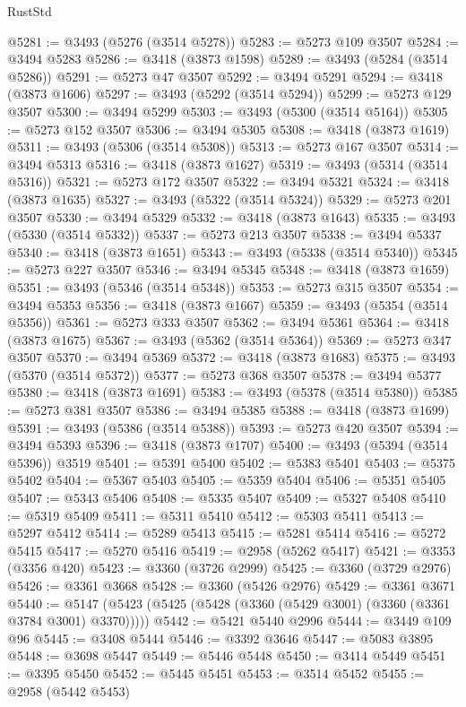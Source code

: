 \begin{lexlean}{RustStd}
\begin{coremodule}
@5281 := @3493 (@5276 (@3514 @5278))
@5283 := @5273 @109 @3507
@5284 := @3494 @5283
@5286 := @3418 (@3873 @1598)
@5289 := @3493 (@5284 (@3514 @5286))
@5291 := @5273 @47 @3507
@5292 := @3494 @5291
@5294 := @3418 (@3873 @1606)
@5297 := @3493 (@5292 (@3514 @5294))
@5299 := @5273 @129 @3507
@5300 := @3494 @5299
@5303 := @3493 (@5300 (@3514 @5164))
@5305 := @5273 @152 @3507
@5306 := @3494 @5305
@5308 := @3418 (@3873 @1619)
@5311 := @3493 (@5306 (@3514 @5308))
@5313 := @5273 @167 @3507
@5314 := @3494 @5313
@5316 := @3418 (@3873 @1627)
@5319 := @3493 (@5314 (@3514 @5316))
@5321 := @5273 @172 @3507
@5322 := @3494 @5321
@5324 := @3418 (@3873 @1635)
@5327 := @3493 (@5322 (@3514 @5324))
@5329 := @5273 @201 @3507
@5330 := @3494 @5329
@5332 := @3418 (@3873 @1643)
@5335 := @3493 (@5330 (@3514 @5332))
@5337 := @5273 @213 @3507
@5338 := @3494 @5337
@5340 := @3418 (@3873 @1651)
@5343 := @3493 (@5338 (@3514 @5340))
@5345 := @5273 @227 @3507
@5346 := @3494 @5345
@5348 := @3418 (@3873 @1659)
@5351 := @3493 (@5346 (@3514 @5348))
@5353 := @5273 @315 @3507
@5354 := @3494 @5353
@5356 := @3418 (@3873 @1667)
@5359 := @3493 (@5354 (@3514 @5356))
@5361 := @5273 @333 @3507
@5362 := @3494 @5361
@5364 := @3418 (@3873 @1675)
@5367 := @3493 (@5362 (@3514 @5364))
@5369 := @5273 @347 @3507
@5370 := @3494 @5369
@5372 := @3418 (@3873 @1683)
@5375 := @3493 (@5370 (@3514 @5372))
@5377 := @5273 @368 @3507
@5378 := @3494 @5377
@5380 := @3418 (@3873 @1691)
@5383 := @3493 (@5378 (@3514 @5380))
@5385 := @5273 @381 @3507
@5386 := @3494 @5385
@5388 := @3418 (@3873 @1699)
@5391 := @3493 (@5386 (@3514 @5388))
@5393 := @5273 @420 @3507
@5394 := @3494 @5393
@5396 := @3418 (@3873 @1707)
@5400 := @3493 (@5394 (@3514 @5396)) @3519
@5401 := @5391 @5400
@5402 := @5383 @5401
@5403 := @5375 @5402
@5404 := @5367 @5403
@5405 := @5359 @5404
@5406 := @5351 @5405
@5407 := @5343 @5406
@5408 := @5335 @5407
@5409 := @5327 @5408
@5410 := @5319 @5409
@5411 := @5311 @5410
@5412 := @5303 @5411
@5413 := @5297 @5412
@5414 := @5289 @5413
@5415 := @5281 @5414
@5416 := @5272 @5415
@5417 := @5270 @5416
@5419 := @2958 (@5262 @5417)
@5421 := @3353 (@3356 @420)
@5423 := @3360 (@3726 @2999)
@5425 := @3360 (@3729 @2976)
@5426 := @3361 @3668
@5428 := @3360 (@5426 @2976)
@5429 := @3361 @3671
@5440 := @5147 (@5423 (@5425 (@5428 (@3360 (@5429 @3001) (@3360 (@3361 @3784 @3001) @3370)))))
@5442 := @5421 @5440 @2996
@5444 := @3449 @109 @96
@5445 := @3408 @5444
@5446 := @3392 @3646
@5447 := @5083 @3895
@5448 := @3698 @5447
@5449 := @5446 @5448
@5450 := @3414 @5449
@5451 := @3395 @5450
@5452 := @5445 @5451
@5453 := @3514 @5452
@5455 := @2958 (@5442 @5453)

\end{coremodule}
\end{lexlean}

